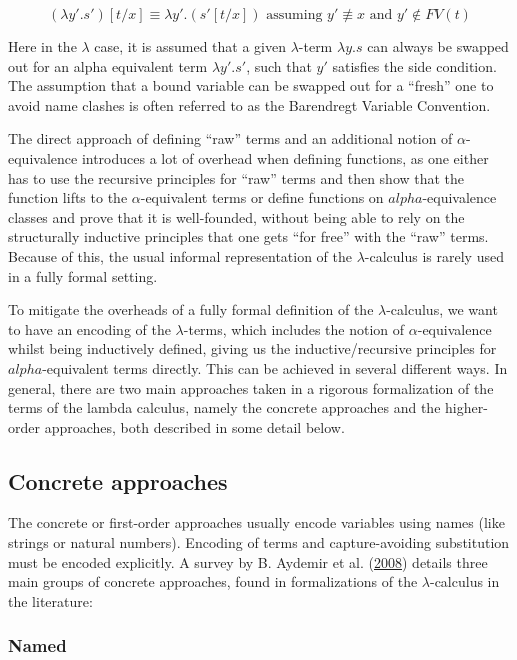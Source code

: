 \documentclass[a4paper, 12pt, twoside]{style/ociamthesis}
\theoremstyle{plain}
\theoremstyle{definition}
\theoremstyle{remark}
\begin{document}
\[(\lambda y'. s')[t/x] \equiv \lambda y'.(s'[t/x]) \text{ assuming } y' \not\equiv x\text{ and }y' \not\in FV(t)\]

Here in the \(\lambda\) case, it is assumed that a given
\(\lambda\)-term \(\lambda y. s\) can always be swapped out for an alpha
equivalent term \(\lambda y'. s'\), such that \(y'\) satisfies the side
condition. The assumption that a bound variable can be swapped out for a
``fresh'' one to avoid name clashes is often referred to as the
Barendregt Variable Convention.

The direct approach of defining ``raw'' terms and an additional notion
of \(\alpha\)-equivalence introduces a lot of overhead when defining
functions, as one either has to use the recursive principles for ``raw''
terms and then show that the function lifts to the \(\alpha\)-equivalent
terms or define functions on \(alpha\)-equivalence classes and prove
that it is well-founded, without being able to rely on the structurally
inductive principles that one gets ``for free'' with the ``raw''
terms.\\
Because of this, the usual informal representation of the
\(\lambda\)-calculus is rarely used in a fully formal setting.

To mitigate the overheads of a fully formal definition of the
\(\lambda\)-calculus, we want to have an encoding of the
\(\lambda\)-terms, which includes the notion of \(\alpha\)-equivalence
whilst being inductively defined, giving us the inductive/recursive
principles for \(alpha\)-equivalent terms directly. This can be achieved
in several different ways. In general, there are two main approaches
taken in a rigorous formalization of the terms of the lambda calculus,
namely the concrete approaches and the higher-order approaches, both
described in some detail below.

\subsection{Concrete approaches}\label{concrete-approaches}

The concrete or first-order approaches usually encode variables using
names (like strings or natural numbers). Encoding of terms and
capture-avoiding substitution must be encoded explicitly. A survey by B.
Aydemir et al. (\protect\hyperlink{ref-aydemir08}{2008}) details three
main groups of concrete approaches, found in formalizations of the
\(\lambda\)-calculus in the literature:

\subsubsection{Named}\label{named}
\end{document}
